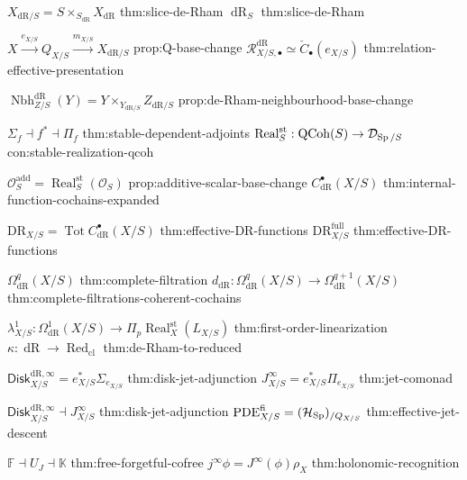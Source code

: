 \begin{longtable}
\NotationPair
{\(X_{\mathrm{dR}/S}=S\times_{S_{\mathrm{dR}}}X_{\mathrm{dR}}\)}
{thm:slice-de-Rham}
{\(\operatorname{dR}_S\)}
{thm:slice-de-Rham}

\NotationPair
{\(X\xrightarrow{e_{X/S}}Q_{X/S}
  \xrightarrow{m_{X/S}}X_{\mathrm{dR}/S}\)}
{prop:Q-base-change}
{\(\mathcal R^{\mathrm{dR}}_{X/S,\bullet}
  \simeq\check C_\bullet(e_{X/S})\)}
{thm:relation-effective-presentation}

\NotationSingle
{\(\operatorname{Nbh}^{\mathrm{dR}}_{Z/S}(Y)
  =Y\times_{Y_{\mathrm{dR}/S}}Z_{\mathrm{dR}/S}\)}
{prop:de-Rham-neighbourhood-base-change}



\NotationPair
{\(\Sigma_f\dashv f^*\dashv\Pi_f\)}
{thm:stable-dependent-adjoints}
{\(\operatorname{Real}^{\mathrm{st}}_S:
  \operatorname{QCoh}(S)\to\mathcal D_{\operatorname{Sp}/S}\)}
{con:stable-realization-qcoh}

\NotationPair
{\(\mathcal O_S^{\mathrm{add}}
  =\operatorname{Real}^{\mathrm{st}}_S(\mathcal O_S)\)}
{prop:additive-scalar-base-change}
{\(C^\bullet_{\mathrm{dR}}(X/S)\)}
{thm:internal-function-cochains-expanded}

\NotationPair
{\(\mathrm{DR}_{X/S}
  =\operatorname*{Tot}C^\bullet_{\mathrm{dR}}(X/S)\)}
{thm:effective-DR-functions}
{\(\mathrm{DR}^{\mathrm{full}}_{X/S}\)}
{thm:effective-DR-functions}

\NotationPair
{\(\Omega^q_{\mathrm{dR}}(X/S)\)}
{thm:complete-filtration}
{\(d_{\mathrm{dR}}:
  \Omega^q_{\mathrm{dR}}(X/S)\to
  \Omega^{q+1}_{\mathrm{dR}}(X/S)\)}
{thm:complete-filtrations-coherent-cochains}

\NotationPair
{\(\lambda^1_{X/S}:
  \Omega^1_{\mathrm{dR}}(X/S)\to
  \Pi_p\operatorname{Real}^{\mathrm{st}}_X(L_{X/S})\)}
{thm:first-order-linearization}
{\(\kappa:\operatorname{dR}\to\operatorname{Red}_{\mathrm{cl}}\)}
{thm:de-Rham-to-reduced}



\NotationPair
{\(\mathsf{Disk}^{\mathrm{dR},\infty}_{X/S}
  =e_{X/S}^*\Sigma_{e_{X/S}}\)}
{thm:disk-jet-adjunction}
{\(J^\infty_{X/S}
  =e_{X/S}^*\Pi_{e_{X/S}}\)}
{thm:jet-comonad}

\NotationPair
{\(\mathsf{Disk}^{\mathrm{dR},\infty}_{X/S}
  \dashv J^\infty_{X/S}\)}
{thm:disk-jet-adjunction}
{\(\operatorname{PDE}^{\mathrm{fi}}_{X/S}
  =(\mathcal H_{\operatorname{Sp}})_{/Q_{X/S}}\)}
{thm:effective-jet-descent}

\NotationPair
{\(\mathbb F\dashv U_J\dashv\mathbb K\)}
{thm:free-forgetful-cofree}
{\(j^\infty\phi=J^\infty(\phi)\rho_X\)}
{thm:holonomic-recognition}



\end{longtable}
